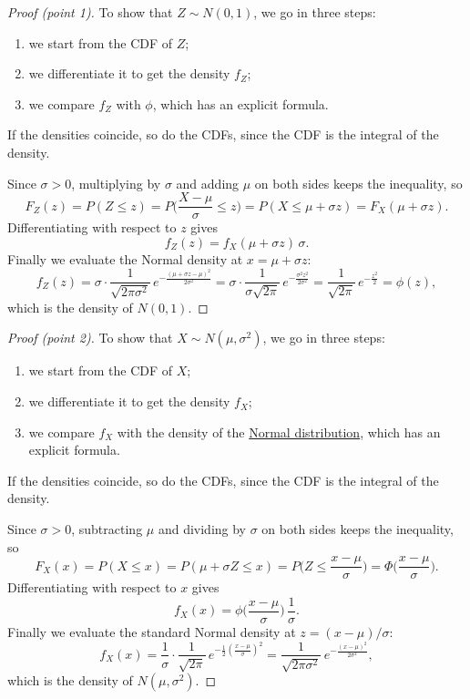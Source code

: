 \documentclass[a4paper,12pt,oneside]{report}
\begin{document}
\begin{proof}[Proof (point 1)]
To show that $Z\sim N(0,1)$, we go in three steps:
\begin{enumerate}
\item we start from the CDF of $Z$;
\item we differentiate it to get the density $f_Z$;
\item we compare $f_Z$ with $\phi$, which has an explicit formula.
\end{enumerate}
If the densities coincide, so do the CDFs, since the CDF is the integral of
the density.

Since $\sigma>0$, multiplying by $\sigma$ and
adding $\mu$ on both sides keeps the inequality, so
\[
F_Z(z)=P(Z\le z)=P\Big(\frac{X-\mu}{\sigma}\le z\Big)=P(X\le\mu+\sigma z)
=F_X(\mu+\sigma z).
\]
Differentiating with respect to $z$ gives
\[
f_Z(z)=f_X(\mu+\sigma z)\,\sigma .
\]
Finally we evaluate the Normal density at $x=\mu+\sigma z$:
\[
f_Z(z)=\sigma\cdot\frac{1}{\sqrt{2\pi\sigma^2}}\,
e^{-\frac{(\mu+\sigma z-\mu)^2}{2\sigma^2}}
=\sigma\cdot\frac{1}{\sigma\sqrt{2\pi}}\,e^{-\frac{\sigma^2z^2}{2\sigma^2}}
=\frac{1}{\sqrt{2\pi}}\,e^{-\frac{z^2}{2}}=\phi(z),
\]
which is the density of $N(0,1)$.
\end{proof}

\begin{proof}[Proof (point 2)]
To show that $X\sim N(\mu,\sigma^2)$, we go in three steps:
\begin{enumerate}
\item we start from the CDF of $X$;
\item we differentiate it to get the density $f_X$;
\item we compare $f_X$ with the density of the
\hyperref[def:normal]{Normal distribution}, which has an explicit formula.
\end{enumerate}
If the densities coincide, so do the CDFs, since the CDF is the integral of
the density.

Since $\sigma>0$, subtracting $\mu$ and
dividing by $\sigma$ on both sides keeps the inequality, so
\[
F_X(x)=P(X\le x)=P(\mu+\sigma Z\le x)=P\Big(Z\le\frac{x-\mu}{\sigma}\Big)
=\Phi\Big(\frac{x-\mu}{\sigma}\Big).
\]
Differentiating with respect to $x$ gives
\[
f_X(x)=\phi\Big(\frac{x-\mu}{\sigma}\Big)\,\frac{1}{\sigma}.
\]
Finally we evaluate the standard Normal density at $z=(x-\mu)/\sigma$:
\[
f_X(x)=\frac{1}{\sigma}\cdot\frac{1}{\sqrt{2\pi}}\,
e^{-\frac{1}{2}\left(\frac{x-\mu}{\sigma}\right)^2}
=\frac{1}{\sqrt{2\pi\sigma^2}}\,e^{-\frac{(x-\mu)^2}{2\sigma^2}},
\]
which is the density of $N(\mu,\sigma^2)$.
\end{proof}
\end{document}
